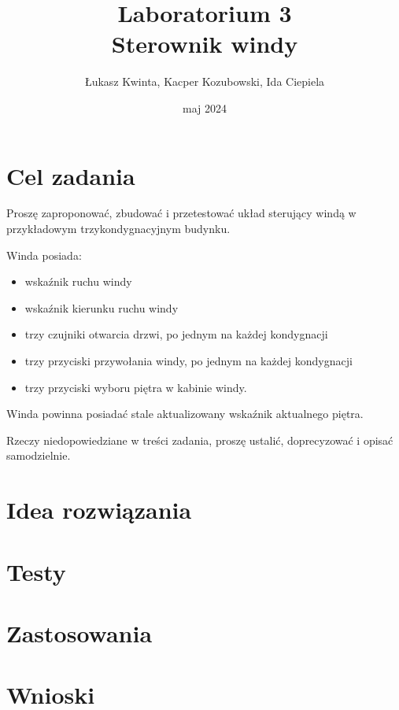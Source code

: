\documentclass[a4paper]{article}
\title{\fontsize{30pt}{30pt}\selectfont Laboratorium 3 \\ Sterownik windy}
\author{\fontsize{20pt}{20pt}\selectfont Łukasz Kwinta, Kacper Kozubowski, Ida Ciepiela}
\date{maj 2024}
\begin{document}
\maketitle
\pagebreak
\large
\tableofcontents

\pagebreak
\section{Cel zadania}
\Large
Proszę zaproponować, zbudować i przetestować układ sterujący windą w przykładowym trzykondygnacyjnym budynku.

Winda posiada:
\begin{itemize}
    \item wskaźnik ruchu windy
    \item wskaźnik kierunku ruchu windy
    \item trzy czujniki otwarcia drzwi, po jednym na każdej kondygnacji
    \item trzy przyciski przywołania windy, po jednym na każdej kondygnacji
    \item trzy przyciski wyboru piętra w kabinie windy.
\end{itemize}

Winda powinna posiadać stale aktualizowany wskaźnik aktualnego piętra.

Rzeczy niedopowiedziane w treści zadania, proszę ustalić, doprecyzować i opisać samodzielnie.

\section{Idea rozwiązania}

\section{Testy}
\section{Zastosowania}
\section{Wnioski}
\end{document}
